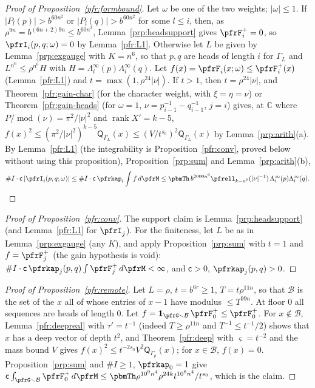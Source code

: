 \documentclass[10pt]{amsart}
\theoremstyle{definition}
\theoremstyle{remark}
\newcommand{\C}{\mathbb C}
\begin{document}
\begin{proof}[Proof of Proposition~\ref{pfr:formbound}]
Let $\omega$ be one of the two weights; $|\omega|\le1$. If $|P_l(p)|>b^{60n^2}$ or $|P_l(q)|>b^{60n^2}$ for some
$l\le i$, then, as $\rho^{9n}=b^{(6n+2)9n}\le b^{60n^2}$, Lemma~\ref{prp:headsupport} gives $\pfrF^+_i=0$, so
$\pfrI_i(p,q;\omega)=0$ by Lemma~\ref{pfr:L1}. Otherwise let $L$ be given by Lemma~\ref{prp:exgauge} with $K=n^6$, so that
$p,q$ are heads of length $i$ for $\Gamma_L$ and $L^{n^6}\le\rho^{n^6}H$ with $H=\Lambda^\infty_i(p)\Lambda^\infty_i(q)$.
Let $f(x)=\pfrF_i(x;\omega)\le\pfrF^+_i(x)$ (Lemma~\ref{pfr:L1}) and $t=\max(1,\rho^{24}|\nu|)$. If $t>1$, then
$t=\rho^{24}|\nu|$, and Theorem~\ref{pfr:gain-char} (for the character weight, with $\xi=\eta=\nu$) or
Theorem~\ref{pfr:gain-heads} (for $\omega=1$, $\nu=p_{i-1}^{-1}-q_{i-1}^{-1}$, $j=i$) gives, at $\C$ where
$P/\operatorname{mod}(\nu)=\pi^2/|\nu|^2$ and $\operatorname{rank}X'=k-5$,
$f(x)^2\le(\pi^2/|\nu|^2)^{k-5}\mathsf Q_{\Gamma_L}(x)\le(V/t^{s_0})^2\mathsf Q_{\Gamma_L}(x)$ by
Lemma~\ref{prp:arith}(a). By Lemma~\ref{pfr:L1} (the integrability is Proposition~\ref{pfr:conv}, proved below
without using this proposition), Proposition~\ref{prp:sum} and Lemma~\ref{prp:arith}(b),
\[
\#I\cdot\mathsf c\,|\pfrI_i(p,q;\omega)|\le\#I\cdot\mathsf c\,\pfrkap_i\int f\,d\pfrM\le\pbmTh\,b^{2000n^9}
\pfrell_{k-n^7}(|\nu|^{-1})\,\Lambda^\infty_i(p)\Lambda^\infty_i(q).\qedhere
\]
\end{proof}

\begin{proof}[Proof of Proposition~\ref{pfr:conv}]
The support claim is Lemma~\ref{prp:headsupport} (and Lemma~\ref{pfr:L1} for $\pfrI_j$). For the finiteness,
let $L$ be as in Lemma~\ref{prp:exgauge} (any $K$), and apply Proposition~\ref{prp:sum} with $t=1$ and $f=\pfrF^+_j$
(the gain hypothesis is void): $\#I\cdot\mathsf c\,\pfrkap_j(p,q)\int\pfrF^+_j\,d\pfrM<\infty$, and $\mathsf c>0$,
$\pfrkap_j(p,q)>0$.
\end{proof}

\begin{proof}[Proof of Proposition~\ref{pfr:remote}]
Let $L=\rho$, $t=b^{6r}\ge1$, $T=t\rho^{11n}$, so that $\mathcal B$ is the set of the $x$ all of whose entries of
$x-1$ have modulus $\le T^{99n}$. At floor $0$ all sequences are heads of length $0$. Let
$f=\mathbf 1_{\pfrG\smallsetminus\mathcal B}\,\pfrF^+_0\le\pfrF^+_0$. For $x\notin\mathcal B$, Lemma~\ref{pfr:deepreal}
with $\tau'=t^{-1}$ (indeed $T\ge\rho^{11n}$ and $T^{-1}\le t^{-1}/2$) shows that $x$ has a deep vector of depth
$t^2$, and Theorem~\ref{pfr:deep} with $\varsigma=t^{-2}$ and the mass bound $V$ gives
$f(x)^2\le t^{-2s_0}V^2\mathsf Q_{\Gamma_\rho}(x)$; for $x\in\mathcal B$, $f(x)=0$. Proposition~\ref{prp:sum} and
$\#I\ge1$, $\pfrkap_0=1$ give
$\mathsf c\int_{\pfrG\smallsetminus\mathcal B}\pfrF^+_0\,d\pfrM\le\pbmTh\rho^{10^9n^4}\rho^{24k}t^{10^8n^4}/t^{s_0}$, which
is the claim.
\end{proof}
\end{document}
